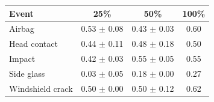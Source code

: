 \begin{tabular}{lccc}
\toprule
Event & 25\% & 50\% & 100\% \\
\midrule
Airbag & 0.53 $\pm$ 0.08 & 0.43 $\pm$ 0.03 & 0.60 \\
Head contact & 0.44 $\pm$ 0.11 & 0.48 $\pm$ 0.18 & 0.50 \\
Impact & 0.42 $\pm$ 0.03 & 0.55 $\pm$ 0.05 & 0.55 \\
Side glass & 0.03 $\pm$ 0.05 & 0.18 $\pm$ 0.00 & 0.27 \\
Windshield crack & 0.50 $\pm$ 0.00 & 0.50 $\pm$ 0.12 & 0.62 \\
\bottomrule
\end{tabular}

